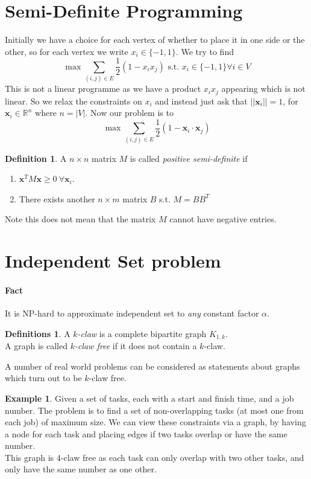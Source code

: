 \documentclass{article}
\theoremstyle{definition}
\newtheorem*{defn}{Definition}
\newtheorem*{defns}{Definitions}
\newtheorem*{ex}{Example}
\newcommand{\RR}{\mathbb{R}}
\newcommand{\x}{\mathbf{x}}
\begin{document}
\section{Semi-Definite Programming}

Initially we have a choice for each vertex of whether to place it in one side or the other, so for each vertex we write $x_i\in\{-1,1\}$.
We try to find
$$\max \sum_{(i,j)\in E} \frac{1}{2}(1-x_ix_j) \text{ s.t. } x_i\in \{-1,1\} \forall i\in V$$
This is not a linear programme as we have a product $x_ix_j$ appearing which is not linear.
So we relax the constraints on $x_i$ and instead just ask that $||\x_i|| = 1$, for $\x_i\in\RR^n$ where $n = |V|$.
Now our problem is to
$$\max \sum_{(i,j)\in E} \frac{1}{2}(1-\x_i\cdot \x_j)$$

\begin{defn}
A $n\times n$ matrix $M$ is called \emph{positive semi-definite} if
\begin{enumerate}
\item $\x^TM\x \ge 0\ \forall \x_i$.
\item There exists another $n\times m$ matrix $B$ s.t. $M=BB^T$
\end{enumerate}
\end{defn}

Note this does not mean that the matrix $M$ cannot have negative entries.



\section{Independent Set problem}

\paragraph{Fact}
It is NP-hard to approximate independent set to \emph{any} constant factor $\alpha$.

\begin{defns}
A \emph{$k$-claw} is a complete bipartite graph $K_{1,k}$. \\
A graph is called \emph{$k$-claw free} if it does not contain a $k$-claw.
\end{defns}

A number of real world problems can be considered as statements about graphs which turn out to be $k$-claw free.

\begin{ex}
Given a set of tasks, each with a start and finish time, and a job number.
The problem is to find a set of non-overlapping tasks (at most one from each job) of maximum size.
We can view these constraints via a graph, by having a node for each task and placing edges if two tasks overlap or have the same number. \\
This graph is 4-claw free as each task can only overlap with two other tasks, and only have the same number as one other. %
\end{ex}
\end{document}
